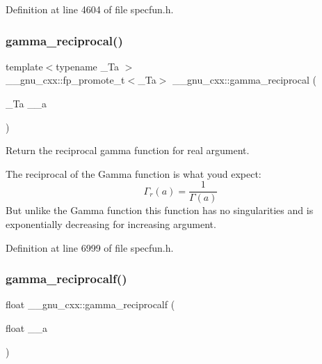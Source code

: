 Definition at line 4604 of file specfun.\+h.

\mbox{\label{group__mathsf__gnu_ga641f9bcdb8fc32a9a0ce7a15b5040076}} 
\subsubsection{\texorpdfstring{gamma\+\_\+reciprocal()}{gamma\_reciprocal()}}
{\footnotesize\ttfamily template$<$typename \+\_\+\+Ta $>$ \\
\+\_\+\+\_\+gnu\+\_\+cxx\+::fp\+\_\+promote\+\_\+t$<$\+\_\+\+Ta$>$ \+\_\+\+\_\+gnu\+\_\+cxx\+::gamma\+\_\+reciprocal (\begin{DoxyParamCaption}\item[{\+\_\+\+Ta}]{\+\_\+\+\_\+a }\end{DoxyParamCaption})\hspace{0.3cm}{\ttfamily [inline]}}

Return the reciprocal gamma function for real argument.

The reciprocal of the Gamma function is what you\textquotesingle{}d expect\+: \[ \Gamma_r(a) = \frac{1}{\Gamma(a)} \] But unlike the Gamma function this function has no singularities and is exponentially decreasing for increasing argument. 

Definition at line 6999 of file specfun.\+h.

\mbox{\label{group__mathsf__gnu_ga10cccd5045490ac24590c094c43107d8}} 
\subsubsection{\texorpdfstring{gamma\+\_\+reciprocalf()}{gamma\_reciprocalf()}}
{\footnotesize\ttfamily float \+\_\+\+\_\+gnu\+\_\+cxx\+::gamma\+\_\+reciprocalf (\begin{DoxyParamCaption}\item[{float}]{\+\_\+\+\_\+a }\end{DoxyParamCaption})\hspace{0.3cm}{\ttfamily [inline]}}

